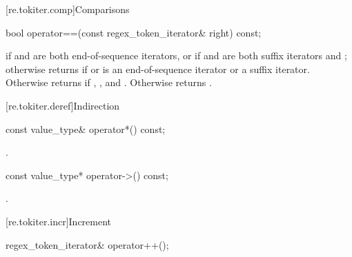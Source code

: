 [re.tokiter.comp]{Comparisons}

%
\begin{itemdecl}
bool operator==(const regex_token_iterator& right) const;
\end{itemdecl}

\begin{itemdescr}
\pnum
\returns
{} if  and  are both end-of-sequence iterators,
or if  and  are both suffix iterators and ;
otherwise returns  if  or  is an end-of-sequence
iterator or a suffix iterator. Otherwise returns  if ,
, and . Otherwise returns .
\end{itemdescr}

[re.tokiter.deref]{Indirection}

%
\begin{itemdecl}
const value_type& operator*() const;
\end{itemdecl}

\begin{itemdescr}
\pnum
\returns
{}.
\end{itemdescr}

%
\begin{itemdecl}
const value_type* operator->() const;
\end{itemdecl}

\begin{itemdescr}
\pnum
\returns
{}.
\end{itemdescr}


[re.tokiter.incr]{Increment}

%
\begin{itemdecl}
regex_token_iterator& operator++();
\end{itemdecl}

